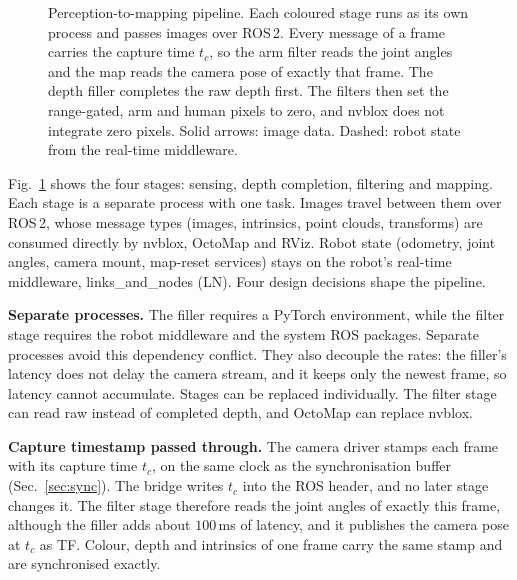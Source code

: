 \documentclass[conference]{IEEEtran}
\begin{document}
\begin{figure}[t]
{}
\caption{Perception-to-mapping pipeline. Each coloured stage runs as its own
process and passes images over ROS\,2. Every message of a frame carries the
capture time \(t_c\), so the arm filter reads the joint angles and the map
reads the camera pose of exactly that frame. The depth filler completes the
raw depth first. The filters then set the range-gated, arm and human pixels
to zero, and nvblox does not integrate zero pixels. Solid arrows: image data.
Dashed: robot state from the real-time middleware.}
\label{fig:architecture}
\end{figure}

Fig.~\ref{fig:architecture} shows the four stages: sensing, depth completion,
filtering and mapping. Each stage is a separate process with one task. Images
travel between them over ROS\,2, whose message types (images, intrinsics,
point clouds, transforms) are consumed directly by nvblox, OctoMap and RViz.
Robot state (odometry, joint angles, camera mount, map-reset services) stays
on the robot's real-time middleware, links\_and\_nodes (LN). Four design
decisions shape the pipeline.

\textbf{Separate processes.} The filler requires a PyTorch environment, while
the filter stage requires the robot middleware and the system ROS packages.
Separate processes avoid this dependency conflict. They also decouple the
rates: the filler's latency does not delay the camera stream, and it keeps
only the newest frame, so latency cannot accumulate. Stages can be replaced
individually. The filter stage can read raw instead of completed depth, and
OctoMap can replace nvblox.

\textbf{Capture timestamp passed through.} The camera driver stamps each frame
with its capture time \(t_c\), on the same clock as the synchronisation buffer
(Sec.~\ref{sec:sync}). The bridge writes \(t_c\) into the ROS header, and no
later stage changes it. The filter stage therefore reads the joint angles of
exactly this frame, although the filler adds about \(100\,\)ms of latency, and
it publishes the camera pose at \(t_c\) as TF. Colour, depth and intrinsics of
one frame carry the same stamp and are synchronised exactly.
\end{document}
